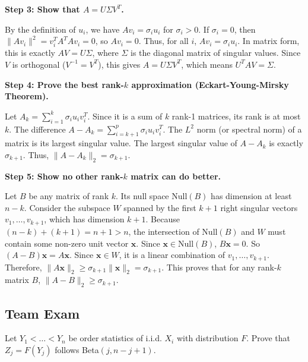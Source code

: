 \begin{solution}
\textbf{Step 3: Show that $A = U \Sigma V^T$.}

By the definition of $u_i$, we have $A v_i = \sigma_i u_i$ for $\sigma_i > 0$. If $\sigma_i = 0$, then $\|A v_i\|^2 = v_i^T A^T A v_i = 0$, so $A v_i = 0$. Thus, for all $i$, $A v_i = \sigma_i u_i$.
In matrix form, this is exactly $A V = U \Sigma$, where $\Sigma$ is the diagonal matrix of singular values. Since $V$ is orthogonal ($V^{-1} = V^T$), this gives $A = U \Sigma V^T$, which means $U^T A V = \Sigma$.

\textbf{Step 4: Prove the best rank-$k$ approximation (Eckart-Young-Mirsky Theorem).}

Let $A_k = \sum_{i=1}^k \sigma_i u_i v_i^T$. Since it is a sum of $k$ rank-1 matrices, its rank is at most $k$.
The difference $A - A_k = \sum_{i=k+1}^p \sigma_i u_i v_i^T$. The $L^2$ norm (or spectral norm) of a matrix is its largest singular value. The largest singular value of $A - A_k$ is exactly $\sigma_{k+1}$. Thus, $\|A - A_k\|_2 = \sigma_{k+1}$.

\textbf{Step 5: Show no other rank-$k$ matrix can do better.}

Let $B$ be any matrix of rank $k$. Its null space $\text{Null}(B)$ has dimension at least $n - k$.
Consider the subspace $W$ spanned by the first $k+1$ right singular vectors $v_1, \dots, v_{k+1}$, which has dimension $k+1$.
Because $(n - k) + (k + 1) = n + 1 > n$, the intersection of $\text{Null}(B)$ and $W$ must contain some non-zero unit vector $\mathbf{x}$.
Since $\mathbf{x} \in \text{Null}(B)$, $B\mathbf{x} = 0$. So $(A - B)\mathbf{x} = A\mathbf{x}$.
Since $\mathbf{x} \in W$, it is a linear combination of $v_1, \dots, v_{k+1}$. Therefore, $\|A\mathbf{x}\|_2 \geq \sigma_{k+1} \|\mathbf{x}\|_2 = \sigma_{k+1}$.
This proves that for any rank-$k$ matrix $B$, $\|A - B\|_2 \geq \sigma_{k+1}$.
\end{solution}

\subsection{Team Exam}

\begin{exercise}\label{probability:2010:7}
Let $Y_1 < \dots < Y_n$ be order statistics of i.i.d. $X_i$ with distribution $F$. Prove that $Z_j = F(Y_j)$ follows Beta$(j, n-j+1)$.
\end{exercise}

